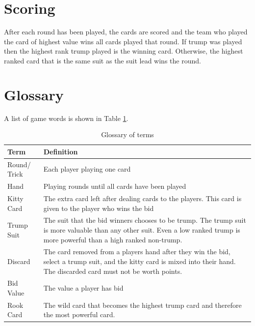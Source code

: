 \documentclass[12pt]{report}
\begin{document}
\section{Scoring}

After each round has been played, the cards are scored and the team who played the card of highest value wins all cards played that round. If trump was played then the highest rank trump played is the winning card. Otherwise, the highest ranked card that is the same suit as the suit lead wins the round.

\section{Glossary}

A list of game words is shown in Table \ref{tab:glossaryterms}.

\begin{table}[ht]
\begin{center}
\begin{tabular}{l p{10cm}}
\hline
Term & Definition \\ \hline
Round/ Trick & Each player playing one card \\ \hline
Hand & Playing rounds until all cards have been played \\ \hline
Kitty Card & The extra card left after dealing cards to the players. This card is given to the player who wins the bid \\ \hline
Trump Suit & The suit that the bid winners chooses to be trump. The trump suit is more valuable than any other suit. Even a low ranked trump is more powerful than a high ranked non-trump. \\ \hline
Discard & The card removed from a players hand after they win the bid, select a trump suit, and the kitty card is mixed into their hand. The discarded card must not be worth points. \\ \hline
Bid Value & The value a player has bid \\ \hline
Rook Card & The wild card that becomes the highest trump card and therefore the most powerful card. \\ \hline
\end{tabular}
\end{center}
\caption{Glossary of terms}
\label{tab:glossaryterms}
\end{table}
\end{document}
